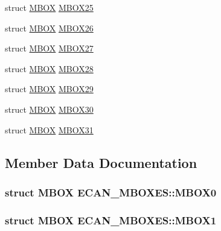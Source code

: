 \begin{DoxyCompactItemize}
\item 
struct \hyperlink{struct_m_b_o_x}{M\+B\+O\+X} \hyperlink{struct_e_c_a_n___m_b_o_x_e_s_aaa9cc367366efaf244021798f06e5fde}{M\+B\+O\+X25}
\item 
struct \hyperlink{struct_m_b_o_x}{M\+B\+O\+X} \hyperlink{struct_e_c_a_n___m_b_o_x_e_s_ae673ce77f934ed44da66cfb2df8e097d}{M\+B\+O\+X26}
\item 
struct \hyperlink{struct_m_b_o_x}{M\+B\+O\+X} \hyperlink{struct_e_c_a_n___m_b_o_x_e_s_ae66029f5d39a93fb28d07c8f99fce2fe}{M\+B\+O\+X27}
\item 
struct \hyperlink{struct_m_b_o_x}{M\+B\+O\+X} \hyperlink{struct_e_c_a_n___m_b_o_x_e_s_aaa5bcf9d7726d59eb27e8ee1a49334d4}{M\+B\+O\+X28}
\item 
struct \hyperlink{struct_m_b_o_x}{M\+B\+O\+X} \hyperlink{struct_e_c_a_n___m_b_o_x_e_s_ab818a7bf63469dd6056e8bbfc29c4993}{M\+B\+O\+X29}
\item 
struct \hyperlink{struct_m_b_o_x}{M\+B\+O\+X} \hyperlink{struct_e_c_a_n___m_b_o_x_e_s_aa7aa3a11bd5c10c1deda3b61cc3e0600}{M\+B\+O\+X30}
\item 
struct \hyperlink{struct_m_b_o_x}{M\+B\+O\+X} \hyperlink{struct_e_c_a_n___m_b_o_x_e_s_ad72758476021949cf112fc6e7f38782c}{M\+B\+O\+X31}
\end{DoxyCompactItemize}


\subsection{Member Data Documentation}
\hypertarget{struct_e_c_a_n___m_b_o_x_e_s_a6b60e77519017f63fb9735f37d6e3b75}{}
\subsubsection[{M\+B\+O\+X0}]{\setlength{\rightskip}{0pt plus 5cm}struct {\bf M\+B\+O\+X} E\+C\+A\+N\+\_\+\+M\+B\+O\+X\+E\+S\+::\+M\+B\+O\+X0}\label{struct_e_c_a_n___m_b_o_x_e_s_a6b60e77519017f63fb9735f37d6e3b75}
\hypertarget{struct_e_c_a_n___m_b_o_x_e_s_a0c338db17858577d01571e7cb8a3acf8}{}
\subsubsection[{M\+B\+O\+X1}]{\setlength{\rightskip}{0pt plus 5cm}struct {\bf M\+B\+O\+X} E\+C\+A\+N\+\_\+\+M\+B\+O\+X\+E\+S\+::\+M\+B\+O\+X1}\label{struct_e_c_a_n___m_b_o_x_e_s_a0c338db17858577d01571e7cb8a3acf8}
\hypertarget{struct_e_c_a_n___m_b_o_x_e_s_ab8aad8373d00e7fa1f557170fd98a1a8}{}
